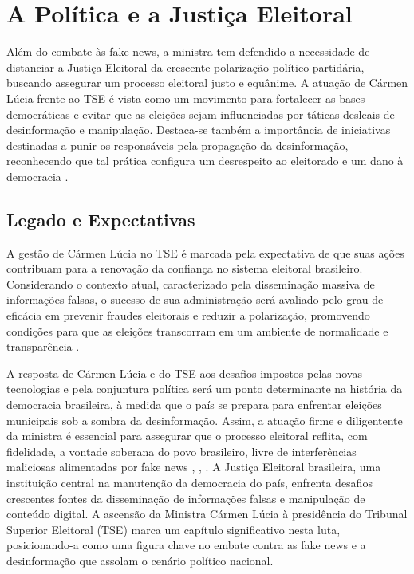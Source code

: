 \documentclass[
   article,       
   12pt,          
   oneside,       
   a4paper,       
   english,       
   brazil,        
   sumario=tradicional
   ]{abntex2}
\begin{document}
\section{A Política e a Justiça Eleitoral}
Além do combate às fake news, a ministra tem defendido a necessidade de distanciar a Justiça Eleitoral da crescente polarização político-partidária, buscando assegurar um processo eleitoral justo e equânime. A atuação de Cármen Lúcia frente ao TSE é vista como um movimento para fortalecer as bases democráticas e evitar que as eleições sejam influenciadas por táticas desleais de desinformação e manipulação. Destaca-se também a importância de iniciativas destinadas a punir os responsáveis pela propagação da desinformação, reconhecendo que tal prática configura um desrespeito ao eleitorado e um dano à democracia \cite{Carmen_Lucia_tem_de_afastar_TSE_da_polarizaca}.

\subsection{Legado e Expectativas}
A gestão de Cármen Lúcia no TSE é marcada pela expectativa de que suas ações contribuam para a renovação da confiança no sistema eleitoral brasileiro. Considerando o contexto atual, caracterizado pela disseminação massiva de informações falsas, o sucesso de sua administração será avaliado pelo grau de eficácia em prevenir fraudes eleitorais e reduzir a polarização, promovendo condições para que as eleições transcorram em um ambiente de normalidade e transparência \cite{As_duas_preocupacoes_que_rondam_Carmen_Lucia_}.

A resposta de Cármen Lúcia e do TSE aos desafios impostos pelas novas tecnologias e pela conjuntura política será um ponto determinante na história da democracia brasileira, à medida que o país se prepara para enfrentar eleições municipais sob a sombra da desinformação. Assim, a atuação firme e diligentente da ministra é essencial para assegurar que o processo eleitoral reflita, com fidelidade, a vontade soberana do povo brasileiro, livre de interferências maliciosas alimentadas por fake news \cite{Mendonca_e_o_unico_ministro_do_STF_a_faltar_a}, \cite{Pacheco_participa_da_posse_na_Carmen_Lucia_na}, \cite{Quem_centraliza_poderes_em_uma_pessoa_chamase}.
A Justiça Eleitoral brasileira, uma instituição central na manutenção da democracia do país, enfrenta desafios crescentes fontes da disseminação de informações falsas e manipulação de conteúdo digital. A ascensão da Ministra Cármen Lúcia à presidência do Tribunal Superior Eleitoral (TSE) marca um capítulo significativo nesta luta, posicionando-a como uma figura chave no embate contra as fake news e a desinformação que assolam o cenário político nacional.
\end{document}
